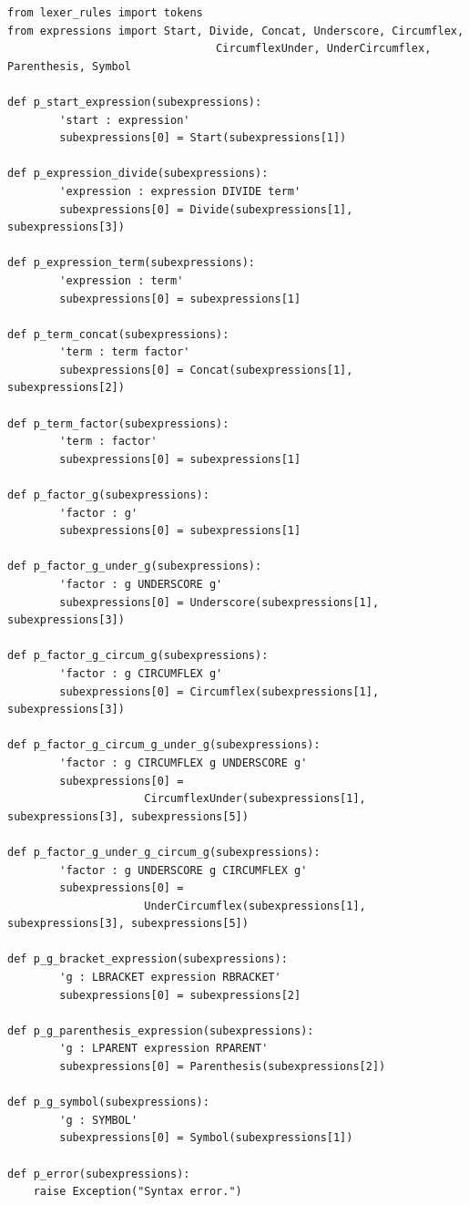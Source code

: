 \begin{verbatim}
from lexer_rules import tokens 
from expressions import Start, Divide, Concat, Underscore, Circumflex, 
                                CircumflexUnder, UnderCircumflex, Parenthesis, Symbol

def p_start_expression(subexpressions):
        'start : expression'
        subexpressions[0] = Start(subexpressions[1])
        
def p_expression_divide(subexpressions):
        'expression : expression DIVIDE term'
        subexpressions[0] = Divide(subexpressions[1], subexpressions[3])

def p_expression_term(subexpressions):
        'expression : term'
        subexpressions[0] = subexpressions[1]

def p_term_concat(subexpressions):
        'term : term factor'
        subexpressions[0] = Concat(subexpressions[1], subexpressions[2])

def p_term_factor(subexpressions):
        'term : factor'
        subexpressions[0] = subexpressions[1]

def p_factor_g(subexpressions):
        'factor : g'
        subexpressions[0] = subexpressions[1]

def p_factor_g_under_g(subexpressions):
        'factor : g UNDERSCORE g'
        subexpressions[0] = Underscore(subexpressions[1], subexpressions[3])

def p_factor_g_circum_g(subexpressions):
        'factor : g CIRCUMFLEX g'
        subexpressions[0] = Circumflex(subexpressions[1], subexpressions[3])

def p_factor_g_circum_g_under_g(subexpressions):
        'factor : g CIRCUMFLEX g UNDERSCORE g'
        subexpressions[0] = 
                     CircumflexUnder(subexpressions[1], subexpressions[3], subexpressions[5])

def p_factor_g_under_g_circum_g(subexpressions):
        'factor : g UNDERSCORE g CIRCUMFLEX g'
        subexpressions[0] = 
                     UnderCircumflex(subexpressions[1], subexpressions[3], subexpressions[5])

def p_g_bracket_expression(subexpressions):
        'g : LBRACKET expression RBRACKET'
        subexpressions[0] = subexpressions[2]

def p_g_parenthesis_expression(subexpressions):
        'g : LPARENT expression RPARENT'
        subexpressions[0] = Parenthesis(subexpressions[2])        

def p_g_symbol(subexpressions):
        'g : SYMBOL'
        subexpressions[0] = Symbol(subexpressions[1])

def p_error(subexpressions):
    raise Exception("Syntax error.")
\end{verbatim}

